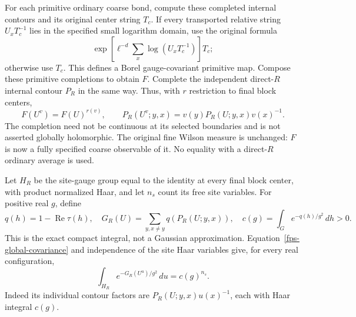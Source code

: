 \documentclass[11pt]{article}
\theoremstyle{remark}
\begin{document}
For each primitive ordinary coarse bond, compute these completed
internal contours and its original center string \(T_c\). If every
transported relative string \(U_xT_c^{-1}\) lies in the specified small
logarithm domain, use the original formula
\[
 \exp\left[\ell^{-d}\sum_x\log(U_xT_c^{-1})\right]T_c;
\]
otherwise use \(T_c\). This defines a Borel gauge-covariant primitive
map. Compose these primitive completions to obtain \(F\). Complete the
independent direct-\(R\) internal contour \(P_R\) in the same way.
Thus, with \(r\) restriction to final block centers,
\begin{equation}
 F(U^v)=F(U)^{r(v)},\qquad
 P_R(U^v;y,x)=v(y)P_R(U;y,x)v(x)^{-1}.
 \label{fps-global-covariance}
\end{equation}
The completion need not be continuous at its selected boundaries and
is not asserted globally holomorphic. The original fine Wilson measure
is unchanged: \(F\) is now a fully specified coarse observable of it.
No equality with a direct-\(R\) ordinary average is used.

Let \(H_R\) be the site-gauge group equal to the identity at every final
block center, with product normalized Haar, and let \(n_s\) count its
free site variables. For positive real \(g\), define
\begin{equation}
 q(h)=1-\operatorname{Re}\tau(h),\quad
 G_R(U)=\sum_{y,x\ne y}q(P_R(U;y,x)),\quad
 c(g)=\int_Ge^{-q(h)/g^2}\,dh>0.
 \label{fps-compact-normalizer}
\end{equation}
This is the exact compact integral, not a Gaussian approximation.
Equation~\eqref{fps-global-covariance} and independence of the site
Haar variables give, for every real configuration,
\begin{equation}
 \int_{H_R}e^{-G_R(U^u)/g^2}\,du=c(g)^{n_s}.
 \label{fps-orbit-normalization}
\end{equation}
Indeed its individual contour factors are
\(P_R(U;y,x)u(x)^{-1}\), each with Haar integral \(c(g)\).
\end{document}
